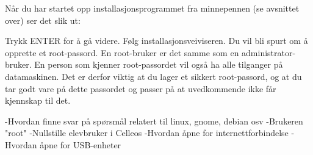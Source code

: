 
N\aa r du har startet opp installasjonsprogrammet fra minnepennen (se avsnittet over) ser det slik ut:

\centerline{
\epsfxsize 9cm
}

Trykk ENTER for \aa{} g\aa{} videre.
F\o lg installasjonsveiviseren. Du vil bli spurt om \aa{} opprette et root-passord. En root-bruker er det samme som en administrator-bruker. En person som kjenner root-passordet vil ogs\aa{} ha alle tilganger p\aa{} datamaskinen. Det er derfor viktig at du lager et sikkert root-passord, og at du tar godt vare p\aa{} dette passordet og passer p\aa{} at uvedkommende ikke f\aa r kjennskap til det. 




-Hvordan finne svar p\aa{} sp\o rsm\aa l relatert til linux, gnome, debian osv
-Brukeren "root"
-Nullstille elevbruker i Celleos
-Hvordan \aa pne for internettforbindelse
-Hvordan \aa pne for USB-enheter

\vfill\eject\bye
